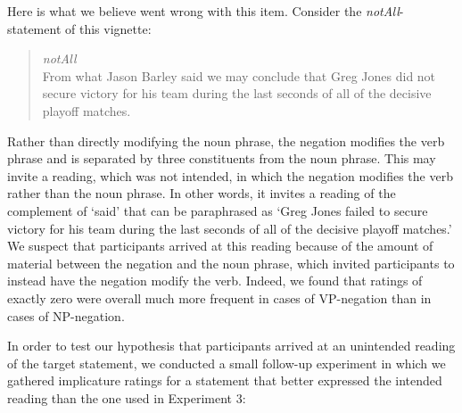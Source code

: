 \documentclass[12pt]{article}
\begin{document}

Here is what we believe went wrong with this item. Consider the \emph{notAll}-statement of this
vignette:

\begin{quote} \emph{notAll} \\
  From what Jason Barley said we may conclude that Greg Jones did not secure victory for his
  team during the last seconds of all of the decisive playoff matches.
\end{quote}

\noindent Rather than directly modifying the noun phrase, the negation modifies the verb phrase
and is separated by three constituents from the noun phrase. This may invite a reading, which
was not intended, in which the negation modifies the verb rather than the noun phrase. In other
words, it invites a reading of the complement of `said' that can be paraphrased as `Greg Jones
failed to secure victory for his team during the last seconds of all of the decisive playoff
matches.' We suspect that participants arrived at this reading because of the amount of
material between the negation and the noun phrase, which invited participants to instead have
the negation modify the verb. Indeed, we found that ratings of exactly zero were overall much
more frequent in cases of VP-negation than in cases of NP-negation. 

In order to test our hypothesis that participants arrived at an unintended reading of the
target statement, we conducted a small follow-up experiment in which we gathered implicature
ratings for a statement that better expressed the intended reading than the one used in
Experiment 3:
\end{document}
